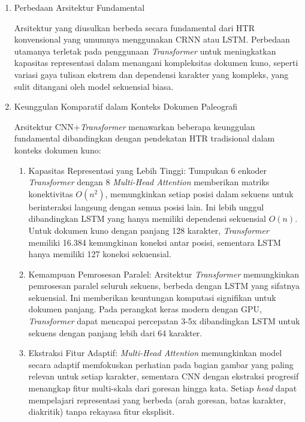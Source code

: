 \begin{enumerate}[leftmargin=*, labelindent=0pt, itemsep=1ex, topsep=0pt]

\item Perbedaan Arsitektur Fundamental
\label{para:perbedaan-arsitektur-fundamental}

Arsitektur yang diusulkan berbeda secara fundamental dari HTR konvensional yang umumnya menggunakan CRNN atau LSTM. Perbedaan utamanya terletak pada penggunaan \textit{Transformer} untuk meningkatkan kapasitas representasi dalam menangani kompleksitas dokumen kuno, seperti variasi gaya tulisan ekstrem dan dependensi karakter yang kompleks, yang sulit ditangani oleh model sekuensial biasa.

\item Keunggulan Komparatif dalam Konteks Dokumen Paleografi
\label{para:keunggulan-komparatif-paleografi}

Arsitektur CNN+\textit{Transformer} menawarkan beberapa keunggulan fundamental dibandingkan dengan pendekatan HTR tradisional dalam konteks dokumen kuno:

\begin{enumerate}[leftmargin=1.5em, labelsep=0.5em, itemindent=0pt, label=\alph*., topsep=0pt, parsep=0pt, itemsep=0pt]
      \item Kapasitas Representasi yang Lebih Tinggi: \mbox{} Tumpukan 6 enkoder \textit{Transformer} dengan 8 \textit{Multi-Head Attention} memberikan matriks konektivitas $O(n^2)$, memungkinkan setiap posisi dalam sekuens untuk berinteraksi langsung dengan semua posisi lain. Ini lebih unggul dibandingkan LSTM yang hanya memiliki dependensi sekuensial $O(n)$. Untuk dokumen kuno dengan panjang 128 karakter, \textit{Transformer} memiliki 16.384 kemungkinan koneksi antar posisi, sementara LSTM hanya memiliki 127 koneksi sekuensial.

      \item Kemampuan Pemrosesan Paralel: \mbox{} Arsitektur \textit{Transformer} memungkinkan pemrosesan paralel seluruh sekuens, berbeda dengan LSTM yang sifatnya sekuensial. Ini memberikan keuntungan komputasi signifikan untuk dokumen panjang. Pada perangkat keras modern dengan GPU, \textit{Transformer} dapat mencapai percepatan 3-5x dibandingkan LSTM untuk sekuens dengan panjang lebih dari 64 karakter.

      \item Ekstraksi Fitur Adaptif: \mbox{} \textit{Multi-Head Attention} memungkinkan model secara adaptif memfokuskan perhatian pada bagian gambar yang paling relevan untuk setiap karakter, sementara CNN dengan ekstraksi progresif menangkap fitur multi-skala dari goresan hingga kata. Setiap \textit{head} dapat mempelajari representasi yang berbeda (arah goresan, batas karakter, diakritik) tanpa rekayasa fitur eksplisit.


\end{enumerate}
\end{enumerate}
